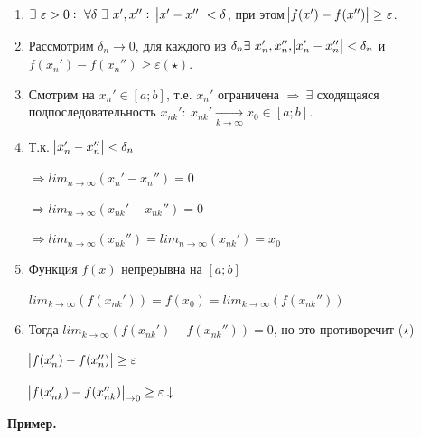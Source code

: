 \documentclass{article}
\begin{document}
    \begin{enumerate}
        \item \(\exists\ \varepsilon > 0:\ \forall \delta\ \exists\ x', x'':\ \abs{x' - x''} < \delta\), при этом \(\abs{f(x')-f(x'')} \geq \varepsilon\).
        \item Рассмотрим \(\delta_n \rightarrow 0\), для каждого из \(\delta_n \exists\ x_n', x_n'', \abs{x_n' - x_n''} < \delta_n\) и \(f(x_n') - f(x_n'') \geq \varepsilon(\star)\).
        \item Смотрим на \(x_n' \in [a; b]\), т.е. \(x_n'\) ограничена \(\Rightarrow\ \exists\) сходящаяся подпоследовательность \(x_{nk}':\ x_{nk}' \xrightarrow[k \rightarrow \infty]{} x_0 \in [a; b]\).
        \item Т.к. \( \abs{x_n' - x_n''} < \delta_n \)
        
        \( \Rightarrow lim_{n \to \infty}(x_n' - x_n'') = 0 \)

        \( \Rightarrow lim_{n \to \infty}(x_{nk}' - x_{nk}'') = 0\)

        \( \Rightarrow lim_{n \to \infty}(x_{nk}'') = lim_{n \to \infty}(x_{nk}') = x_0\)
        \item Функция \(f(x)\) непрерывна на \([a; b]\)
        
        \( lim_{k \to \infty}(f(x_{nk}')) = f(x_0) = lim_{k \to \infty}(f(x_{nk}'')) \)
        \item Тогда \( lim_{k \to \infty}(f(x_{nk}') - f(x_{nk}'')) = 0 \), но это противоречит (\(\star\))
        
        \( \abs{f(x_n') - f(x_n'')} \geq \varepsilon \)

        \( \abs{f(x_{nk}') - f(x_{nk}'')}_{\to 0} \geq \varepsilon \downarrow \)
    \end{enumerate}

    \textbf{Пример.}
\end{document}
